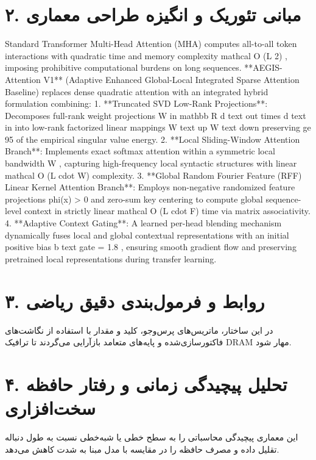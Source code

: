 \documentclass[12pt,a4paper]{article}
\begin{document}
\section*{۲. مبانی تئوریک و انگیزه طراحی معماری}
Standard Transformer Multi-Head Attention (MHA) computes all-to-all token interactions with quadratic time and memory complexity mathcal O (L 2) , imposing prohibitive computational burdens on long sequences. **AEGIS-Attention V1** (Adaptive Enhanced Global-Local Integrated Sparse Attention Baseline) replaces dense quadratic attention with an integrated hybrid formulation combining: 1. **Truncated SVD Low-Rank Projections**: Decomposes full-rank weight projections W in mathbb R d text out times d text in into low-rank factorized linear mappings W text up W text down preserving ge 95 of the empirical singular value energy. 2. **Local Sliding-Window Attention Branch**: Implements exact softmax attention within a symmetric local bandwidth W , capturing high-frequency local syntactic structures with linear mathcal O (L cdot W) complexity. 3. **Global Random Fourier Feature (RFF) Linear Kernel Attention Branch**: Employs non-negative randomized feature projections phi(x) > 0 and zero-sum key centering to compute global sequence-level context in strictly linear mathcal O (L cdot F) time via matrix associativity. 4. **Adaptive Context Gating**: A learned per-head blending mechanism dynamically fuses local and global contextual representations with an initial positive bias b text gate = 1.8 , ensuring smooth gradient flow and preserving pretrained local representations during transfer learning.

\section*{۳. روابط و فرمول‌بندی دقیق ریاضی}
در این ساختار، ماتریس‌های پرس‌وجو، کلید و مقدار با استفاده از نگاشت‌های فاکتورسازی‌شده و پایه‌های متعامد بازآرایی می‌گردند تا ترافیک DRAM مهار شود.

\section*{۴. تحلیل پیچیدگی زمانی و رفتار حافظه سخت‌افزاری}
این معماری پیچیدگی محاسباتی را به سطح خطی یا شبه‌خطی نسبت به طول دنباله تقلیل داده و مصرف حافظه را در مقایسه با مدل مبنا به شدت کاهش می‌دهد.
\end{document}
